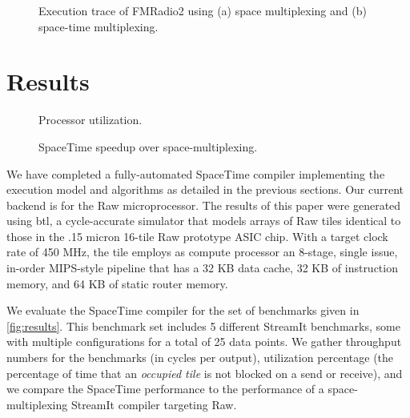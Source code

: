\begin{figure}[t]
\centering
{}
\vspace{-6pt}
\caption{Execution trace of FMRadio2 using (a) space multiplexing and (b) space-time multiplexing.
\protect\label{fig:bloodgraph}}
\end{figure}

\section{Results}
\label{sec:results}

\begin{figure*}[t]
\centering
{}
\vspace{-6pt}
\caption{Benchmark characteristics, performance evaluation and
comparison to space-multiplexing. 
\protect\label{fig:results}}
\end{figure*}
\begin{figure}[t]
\centering
{}
\vspace{-6pt}
\caption{Processor utilization.
\protect\label{fig:util}}
\end{figure}

\begin{figure}[t]
\centering
{}
\vspace{-6pt}
\caption{SpaceTime speedup over space-multiplexing.
\protect\label{fig:speedup}}
\end{figure}


We have completed a fully-automated SpaceTime compiler implementing
the execution model and algorithms as detailed in the previous
sections. Our current backend is for the Raw microprocessor. The
results of this paper were generated using btl, a cycle-accurate
simulator that models arrays of Raw tiles identical to those in the
.15 micron 16-tile Raw prototype ASIC chip.  With a target clock rate
of 450 MHz, the tile employs as compute processor an 8-stage, single
issue, in-order MIPS-style pipeline that has a 32 KB data cache, 32 KB
of instruction memory, and 64 KB of static router memory.

We evaluate the SpaceTime compiler for the set of benchmarks given in
\ref{fig:results}.  This benchmark set includes 5 different StreamIt
benchmarks, some with multiple configurations for a total of 25 data
points.  We gather throughput numbers for the benchmarks (in cycles
per output), utilization percentage (the percentage of time that an
{\it occupied tile} is not blocked on a send or receive), and we
compare the SpaceTime performance to the performance of a
space-multiplexing StreamIt compiler targeting Raw.  

